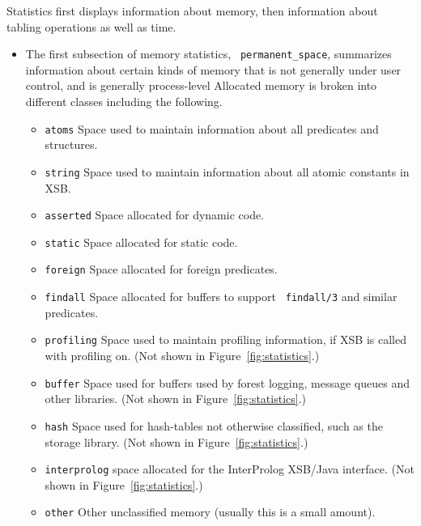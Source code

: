 \begin{description}
Statistics first displays information about memory, then information
about tabling operations as well as time.
\begin{itemize} 
\item The first subsection of memory statistics, {\tt
  permanent\_space}, summarizes information about certain kinds of
  memory that is not generally under user control, and is generally
  process-level
  Allocated memory is broken into different classes including the
  following.
\begin{itemize}
\item {\tt atoms} Space used to maintain information about all
  predicates and structures. 
%
\item {\tt string} Space used to maintain information about all atomic
  constants in XSB.
%
\item {\tt asserted} Space allocated for dynamic code.
%
\item {\tt static} Space allocated for static code.
%
\item {\tt foreign} Space allocated for foreign predicates.
%
%
\item {\tt findall} Space allocated for buffers to support {\tt
  findall/3} and similar predicates.
%
\item {\tt profiling} Space used to maintain profiling information, if
  XSB is called with profiling on.  (Not shown in
  Figure~\ref{fig:statistics}.)
%
%
\item {\tt buffer} Space used for buffers used by forest logging,
  message queues and other libraries.  (Not shown in
  Figure~\ref{fig:statistics}.)
%
%
\item {\tt hash} Space used for hash-tables not otherwise classified,
  such as the storage library.  (Not shown in
  Figure~\ref{fig:statistics}.)

\item {\tt interprolog} space allocated for the InterProlog XSB/Java
  interface. (Not shown in Figure~\ref{fig:statistics}.)
%
%
\item {\tt other} Other unclassified memory (usually this is a small
  amount).


\end{itemize}
\end{itemize}
\end{description}
